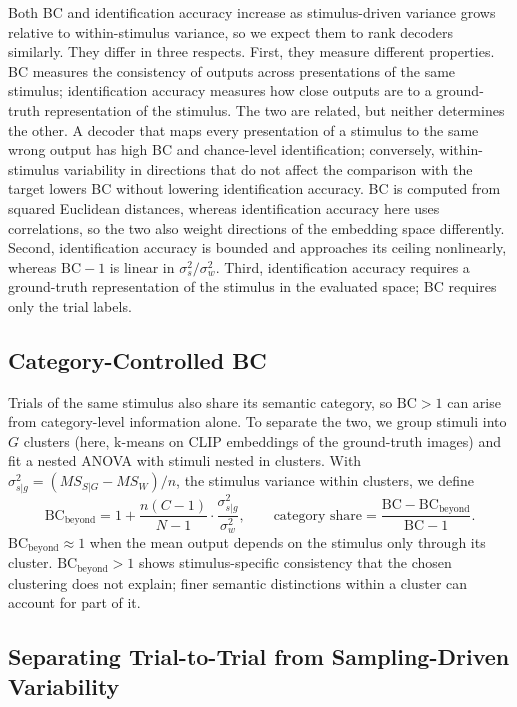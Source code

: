 \documentclass[11pt,a4paper]{article}
\begin{document}
Both BC and identification accuracy increase as stimulus-driven variance grows
relative to within-stimulus variance, so we expect them to rank decoders
similarly. They differ in three respects. First, they measure different
properties. BC measures the consistency of outputs across presentations of the
same stimulus; identification accuracy measures how close outputs are to a
ground-truth representation of the stimulus. The two are related, but neither
determines the other. A decoder that
maps every presentation of a stimulus to the same wrong output has high BC and
chance-level identification; conversely, within-stimulus variability in
directions that do not affect the comparison with the target lowers BC without
lowering identification accuracy. BC is computed from squared Euclidean
distances, whereas identification accuracy here uses correlations, so the two
also weight directions of the embedding space differently. Second, identification accuracy is
bounded and approaches its ceiling nonlinearly, whereas $\mathrm{BC}-1$ is
linear in $\sigma_s^2/\sigma_w^2$. Third, identification accuracy requires a
ground-truth representation of the stimulus in the evaluated space; BC requires
only the trial labels.

\subsection{Category-Controlled BC}
\label{sec:beyond}

Trials of the same stimulus also share its semantic category, so $\mathrm{BC}>1$
can arise from category-level information alone. To separate the two, we group
stimuli into $G$ clusters (here, k-means on CLIP embeddings of the ground-truth
images) and fit a nested ANOVA with stimuli nested in clusters. With
$\sigma_{s|g}^2=(MS_{S|G}-MS_W)/n$, the stimulus variance within clusters, we
define
\begin{equation}
  \mathrm{BC}_\text{beyond}
  = 1 + \frac{n(C-1)}{N-1}\cdot\frac{\sigma_{s|g}^2}{\sigma_w^2},
  \qquad
  \text{category share} = \frac{\mathrm{BC}-\mathrm{BC}_\text{beyond}}{\mathrm{BC}-1}.
\end{equation}
$\mathrm{BC}_\text{beyond}\approx1$ when the mean output depends on the stimulus
only through its cluster. $\mathrm{BC}_\text{beyond}>1$ shows stimulus-specific
consistency that the chosen clustering does not explain; finer semantic
distinctions within a cluster can account for part of it.

\subsection{Separating Trial-to-Trial from Sampling-Driven Variability}
\label{sec:seed}
\end{document}
